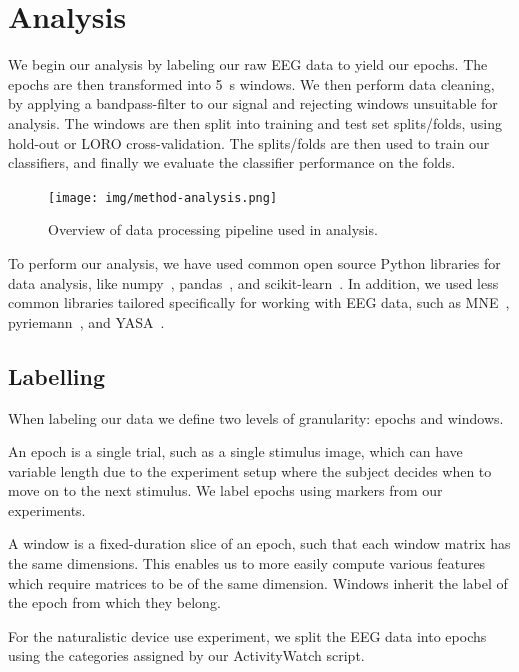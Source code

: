 \vfill
\pagebreak
\section{Analysis}

    We begin our analysis by labeling our raw EEG data to yield our epochs. The epochs are then transformed into \SI{5}{\second} windows. We then perform data cleaning, by applying a bandpass-filter to our signal and rejecting windows unsuitable for analysis. The windows are then split into training and test set splits/folds, using hold-out or LORO cross-validation. The splits/folds are then used to train our classifiers, and finally we evaluate the classifier performance on the folds.

    \begin{figure}[h]
        \centering
        \texttt{[image: img/method-analysis.png]}
        \caption{Overview of data processing pipeline used in analysis.}\label{fig:method-analysis}
    \end{figure}

    To perform our analysis, we have used common open source Python libraries for data analysis, like numpy~\cite{harris2020array}, pandas~\cite{reback2020pandas}, and scikit-learn~\cite{scikit-learn}. In addition, we used less common libraries tailored specifically for working with EEG data, such as MNE~\cite{noauthor_mne-python_2020}, pyriemann~\cite{alexandre_barachant_2020_3715511}, and YASA~\cite{vallat_yasa_2020}.

    \subsection{Labelling}
        When labeling our data we define two levels of granularity: epochs and windows.

        An epoch is a single trial, such as a single stimulus image, which can have variable length due to the experiment setup where the subject decides when to move on to the next stimulus. We label epochs using markers from our experiments.

        A window is a fixed-duration slice of an epoch, such that each window matrix has the same dimensions. This enables us to more easily compute various features which require matrices to be of the same dimension. Windows inherit the label of the epoch from which they belong.

        For the naturalistic device use experiment, we split the EEG data into epochs using the categories assigned by our ActivityWatch script.

